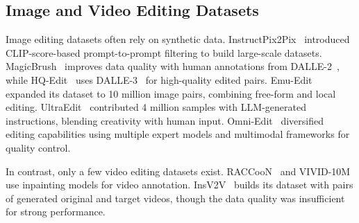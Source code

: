 \subsection{Image and Video Editing Datasets}
Image editing datasets often rely on synthetic data. InstructPix2Pix~\cite{instructpix2pix_brooks2023instructpix2pix} introduced CLIP-score-based prompt-to-prompt filtering to build large-scale datasets. MagicBrush~\cite{magic_brush_zhang2024magicbrush} improves data quality with human annotations from DALLE-2~\cite{dalle2_ramesh2022hierarchical}, while HQ-Edit~\cite{hq_edit_hui2024hq} uses DALLE-3~\cite{dalle3_betker2023improving} for high-quality edited pairs. Emu-Edit~\cite{emu_edit_sheynin2024emu} expanded its dataset to 10 million image pairs, combining free-form and local editing. UltraEdit~\cite{ultraedit_zhao2024ultraedit} contributed 4 million samples with LLM-generated instructions, blending creativity with human input. Omni-Edit~\cite{omniedit_wei2024omniedit} diversified editing capabilities using multiple expert models and multimodal frameworks for quality control.

In contrast, only a few video editing datasets exist. RACCooN~\cite{raccon_yoon2024raccoonremoveaddchange} and VIVID-10M use inpainting models for video annotation. InsV2V~\cite{insv2v_cheng2024consistent} builds its dataset with pairs of generated original and target videos, though the data quality was insufficient for strong performance.